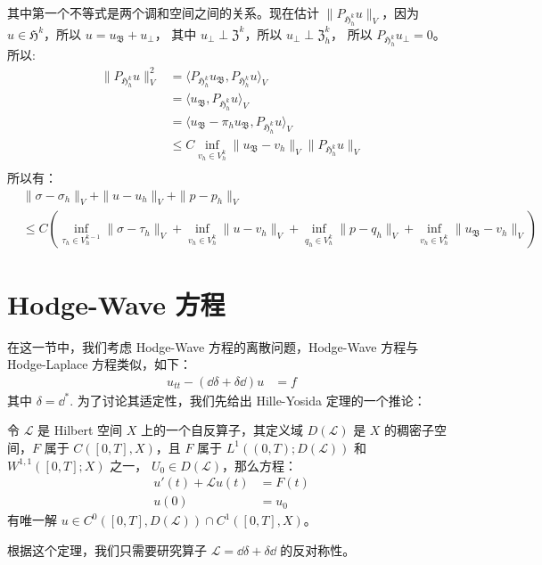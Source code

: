 \documentclass[lang=cn,a4paper,newtx]{elegantpaper}
\begin{document}
其中第一个不等式是两个调和空间之间的关系。现在估计 $\|P_{\mathfrak{H}_h^k}
u\|_V$，因为 $u \in \mathfrak{H}^k$，所以 $u = u_{\mathfrak{B}} + u_{\perp}$，
其中 $u_{\perp}\perp \mathfrak{Z}^k$，所以 $u_{\perp} \perp \mathfrak{Z}_h^k$，
所以 $P_{\mathfrak{H}_h^k} u_{\perp} = 0$。所以:
$$
\begin{aligned}
\|P_{\mathfrak{H}_h^k} u\|_V^2 & = \langle P_{\mathfrak{H}_h^k} u_{\mathfrak{B}}, 
P_{\mathfrak{H}_h^k} u\rangle_V\\ 
& = \langle u_{\mathfrak{B}}, P_{\mathfrak{H}_h^k} u\rangle_V\\
& = \langle u_{\mathfrak{B}} - \pi_h u_{\mathfrak{B}}, P_{\mathfrak{H}_h^k}
u\rangle_V\\
&\leq C\inf_{v_h \in V_h^k} \|u_{\mathfrak{B}} - v_h\|_V\|P_{\mathfrak{H}_h^k}
u\|_V\\
\end{aligned}
$$
所以有：
\begin{align}
    \label{discreteconvergence}  
    &\|\sigma - \sigma_h\|_V + \|u - u_h\|_V + \|p - p_h\|_V\\
    &\leq C(\inf_{\tau_h \in V_h^{k-1}} \|\sigma - \tau_h\|_V + 
        \inf_{v_h \in V_h^k} \|u - v_h\|_V + \inf_{q_h \in V_h^k} \|p
        - q_h\|_V
    + \inf_{v_h \in V_h^k} \|u_{\mathfrak{B}} - v_h\|_V)\nonumber
\end{align}
\section{Hodge-Wave 方程}
在这一节中，我们考虑 Hodge-Wave 方程的离散问题，Hodge-Wave 方程与 Hodge-Laplace
方程类似，如下：
\begin{equation}
\label{hodgewave}
\begin{aligned}
    u_{tt} - (\dd \delta + \delta \dd) u & = f
\end{aligned}
\end{equation}
其中 $\delta = \dd^*$. 为了讨论其适定性，我们先给出 Hille-Yosida
定理的一个推论：
\begin{theorem}
    令 $\mathcal{L}$ 是 Hilbert 空间 $X$ 上的一个自反算子，其定义域
    $D(\mathcal{L})$ 是 $X$ 的稠密子空间，$F$ 属于 $C([0, T], X)$，且 $F$ 属于
    $L^1((0, T); D(\mathcal{L}))$ 和 $W^{1,1}([0, T]; X)$ 之一，
    $U_0 \in D(\mathcal{L})$，那么方程：
    $$
    \begin{aligned}
        u'(t) + \mathcal{L}u(t) & = F(t)\\
        u(0) & = u_0
    \end{aligned}
    $$
    有唯一解 $u \in C^0([0, T], D(\mathcal{L}))\cap C^1([0, T], X)$。
\end{theorem}
根据这个定理，我们只需要研究算子 $\mathcal{L} = \dd \delta + \delta \dd$
的反对称性。
\end{document}
